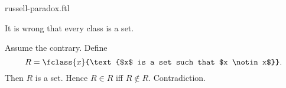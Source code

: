 \documentclass{article}
\begin{document}
\begin{smodule}{russell-paradox.ftl}
  \begin{ftheorem*}[label=russell_paradox,title=Russell's Paradox]
    It is wrong that every class is a set.
  \end{ftheorem*}
  \begin{fproof}
    Assume the contrary.
    Define \[R = \fclass{x}{\text{$x$ is a set such that $x \notin x$}}.\]
    Then $R$ is a set.
    Hence $R \in R$ iff $R \notin R$.
    Contradiction.
  \end{fproof}
\end{smodule}
\end{document}
